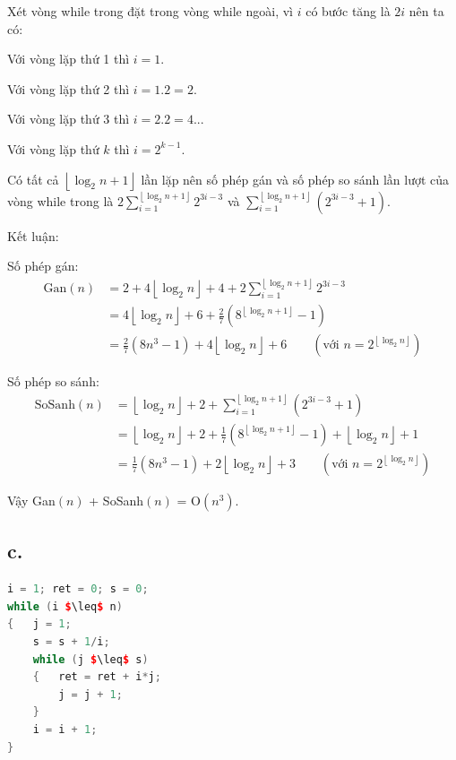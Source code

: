 \documentclass[12pt, a4paper, fleqn]{article}
\begin{document}
	Xét vòng while trong đặt trong vòng while ngoài, vì $i$ có bước tăng là $2i$ nên ta có:
	
	Với vòng lặp thứ 1 thì $i = 1$.
	
	Với vòng lặp thứ 2 thì $i = 1.2 = 2$.
	
	Với vòng lặp thứ 3 thì $i = 2.2 = 4$...
	
	Với vòng lặp thứ $k$ thì $i = 2^{k - 1}$.
	
	Có tất cả $\left\lfloor \log_2 n + 1 \right\rfloor$ lần lặp nên số phép gán và số phép so sánh lần lượt của vòng while trong là $\displaystyle 2 \sum_{i = 1}^{\left\lfloor \log_2 n + 1 \right\rfloor} 2^{3i - 3}$ và $\displaystyle \sum_{i = 1}^{\left\lfloor \log_2 n + 1 \right\rfloor} \left( 2^{3i - 3} + 1 \right)$.
	
	Kết luận:
	
	Số phép gán:
	\begin{align*}
		\text{Gan}(n) &= 2 + 4 \left\lfloor \log_2 n \right\rfloor + 4 + 2 \sum_{i = 1}^{\left\lfloor \log_2 n + 1 \right\rfloor} 2^{3i - 3} \\
					  &= 4 \left\lfloor \log_2 n \right\rfloor + 6 + \frac{2}{7}\left( 8^{\left\lfloor \log_2 n + 1 \right\rfloor} - 1 \right) \\
					  &= \frac{2}{7}\left( 8n^3 - 1 \right) + 4 \left\lfloor \log_2 n \right\rfloor + 6 \qquad \left( \text{với } n = 2^{\left\lfloor \log_2 n \right\rfloor} \right) 
	\end{align*}
	
	Số phép so sánh:
	\begin{align*}
		\text{SoSanh}(n) &= \left\lfloor \log_2 n \right\rfloor + 2 + \sum_{i = 1}^{\left\lfloor \log_2 n + 1 \right\rfloor} \left( 2^{3i - 3} + 1 \right) \\
						 &= \left\lfloor \log_2 n \right\rfloor + 2 + \frac{1}{7}\left( 8^{\left\lfloor \log_2 n + 1 \right\rfloor} - 1 \right) + \left\lfloor \log_2 n \right\rfloor + 1 \\
						 &= \frac{1}{7}\left( 8n^3 - 1 \right) + 2 \left\lfloor \log_2 n \right\rfloor + 3 \qquad \left( \text{với } n = 2^{\left\lfloor \log_2 n \right\rfloor} \right) 
	\end{align*}
	
	Vậy Gan$(n)$ + SoSanh$(n)$ = O$(n^3)$.
	
	\subsection*{c.}
	
	\begin{lstlisting}[language = C++, mathescape]
i = 1; ret = 0; s = 0;
while (i $\leq$ n)
{	j = 1;
	s = s + 1/i;
	while (j $\leq$ s)
	{	ret = ret + i*j;
		j = j + 1;
	}
	i = i + 1;
}
\end{lstlisting}
	
\end{document}
